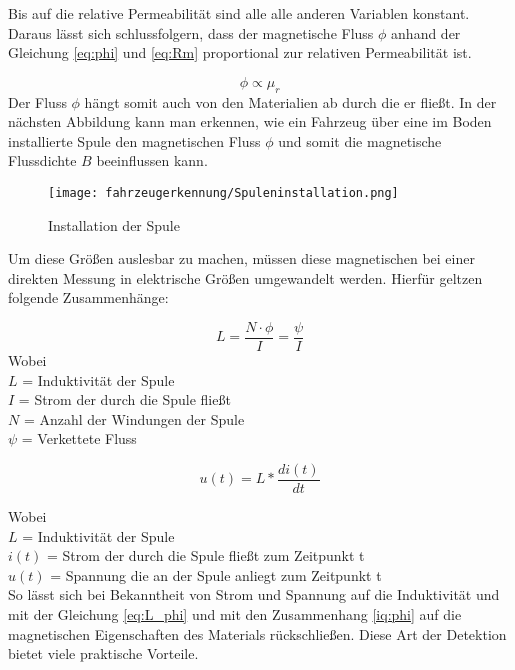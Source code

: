 Bis auf die relative Permeabilität sind alle alle anderen Variablen konstant. Daraus lässt sich schlussfolgern, dass der magnetische
Fluss $\phi$ anhand der Gleichung \ref{eq:phi} und \ref{eq:Rm} proportional zur relativen Permeabilität ist. 

\begin{equation} \label{iq:phi}
    \phi \propto \mu_{r}
\end{equation}
Der Fluss $\phi$ hängt somit auch von den Materialien ab durch die er fließt. In der nächsten Abbildung kann man erkennen,
wie ein Fahrzeug über eine im Boden installierte Spule den magnetischen Fluss $\phi$ und somit die magnetische Flussdichte $B$
beeinflussen kann. 
\begin{figure}[H]
    \centering
    \texttt{[image: fahrzeugerkennung/Spuleninstallation.png]}
    \caption{Installation der Spule}
  \end{figure}
Um diese Größen auslesbar zu machen, müssen diese magnetischen bei einer direkten Messung in elektrische Größen umgewandelt
werden.
Hierfür geltzen folgende Zusammenhänge:

\begin{equation} \label{eq:L_phi}
    L = \frac{N \cdot \phi}{I} = \frac{\psi}{I} 
\end{equation}
Wobei \\
$L$ = Induktivität der Spule \\
$I$ = Strom der durch die Spule fließt \\
$N$ = Anzahl der Windungen der Spule \\
$\psi$ = Verkettete Fluss

\pagebreak
\begin{equation} \label{eq:L_i}
    u(t) = L * \frac{di(t)}{dt}
\end{equation}

Wobei \\
$L$ = Induktivität der Spule \\
$i(t)$ = Strom der durch die Spule fließt zum Zeitpunkt t \\
$u(t)$ = Spannung die an der Spule anliegt zum Zeitpunkt t \\

So lässt sich bei Bekanntheit von Strom und Spannung auf die Induktivität und mit der Gleichung \ref{eq:L_phi} 
und mit den Zusammenhang \ref{iq:phi} auf die magnetischen Eigenschaften des Materials rückschließen. 
Diese Art der Detektion bietet viele praktische Vorteile.

